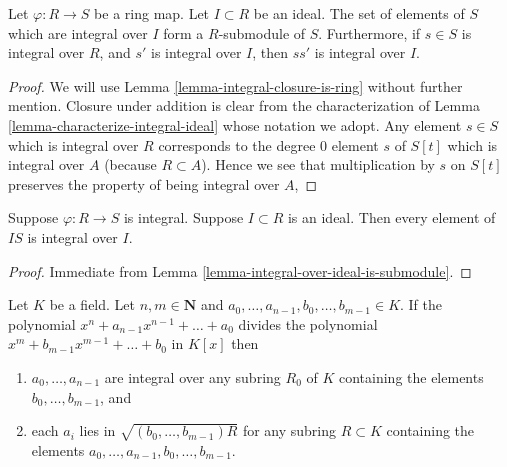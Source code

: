\begin{lemma}
\label{lemma-integral-over-ideal-is-submodule}
Let $\varphi : R \to S$ be a ring map.
Let $I \subset R$ be an ideal.
The set of elements of $S$ which are integral
over $I$ form a $R$-submodule of $S$.
Furthermore, if $s \in S$ is integral over
$R$, and $s'$ is integral over $I$, then
$ss'$ is integral over $I$.
\end{lemma}

\begin{proof}
We will use Lemma \ref{lemma-integral-closure-is-ring} without
further mention. Closure under addition is clear from the
characterization of Lemma \ref{lemma-characterize-integral-ideal}
whose notation we adopt.
Any element $s \in S$ which is integral over
$R$ corresponds to the degree $0$ element $s$ of $S[t]$
which is integral over $A$ (because $R \subset A$).
Hence we see that multiplication by $s$ on $S[t]$
preserves the property of being integral over $A$,
\end{proof}

\begin{lemma}
\label{lemma-integral-integral-over-ideal}
Suppose $\varphi : R \to S$ is integral.
Suppose $I \subset R$ is an ideal.
Then every element of $IS$ is integral over $I$.
\end{lemma}

\begin{proof}
Immediate from Lemma \ref{lemma-integral-over-ideal-is-submodule}.
\end{proof}

\begin{lemma}
\label{lemma-polynomials-divide}
Let $K$ be a field. Let $n, m \in \mathbf{N}$ and
$a_0, \ldots, a_{n - 1}, b_0, \ldots, b_{m - 1} \in K$.
If the polynomial $x^n + a_{n - 1}x^{n - 1} + \ldots + a_0$
divides the polynomial $x^m + b_{m - 1} x^{m - 1} + \ldots + b_0$
in $K[x]$ then
\begin{enumerate}
\item $a_0, \ldots, a_{n - 1}$ are integral over any subring
$R_0$ of $K$ containing the elements $b_0, \ldots, b_{m - 1}$, and
\item each $a_i$ lies in $\sqrt{(b_0, \ldots, b_{m-1})R}$
for any subring $R \subset K$ containing the elements
$a_0, \ldots, a_{n - 1}, b_0, \ldots, b_{m - 1}$.
\end{enumerate}
\end{lemma}

